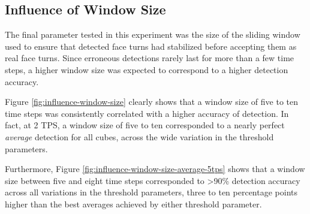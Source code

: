 \subsection{Influence of Window Size}
\label{subsec:influence-window-size}

The final parameter tested in this experiment was the size of the
sliding window used to ensure that detected face turns had stabilized
before accepting them as real face turns. Since erroneous detections
rarely last for more than a few time steps, a higher window size was
expected to correspond to a higher detection accuracy.

Figure \ref{fig:influence-window-size} clearly shows that a window size
of five to ten time steps was consistently correlated with a higher
accuracy of detection. In fact, at 2 TPS, a window size of five to ten
corresponded to a nearly perfect \emph{average} detection for all
cubes, across the wide variation in the threshold parameters.

Furthermore, Figure \ref{fig:influence-window-size-average-5tps} shows
that a window size between five and eight time steps corresponded to
>90\% detection accuracy across all variations in the threshold
parameters, three to ten percentage points higher than the best
averages achieved by either threshold parameter.


